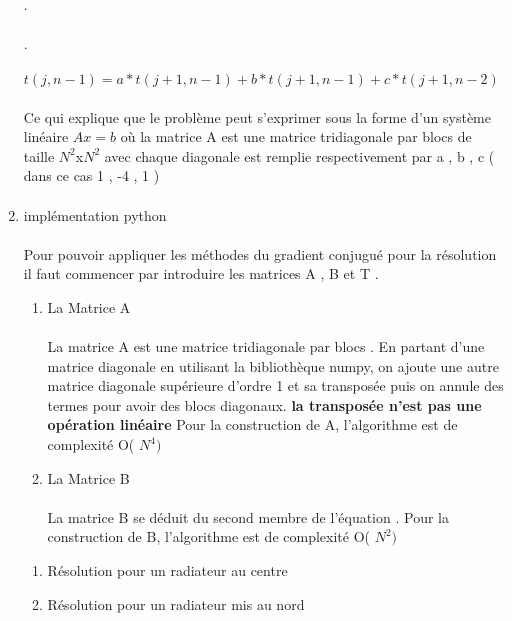 \documentclass{article}
\begin{document}
\begin{enumerate}
    \paragraph{}
    .
    \paragraph{} 
    .
    \paragraph{}
   	
   $t(j,n-1) = a*t(j+1 , n-1) + b*t(j+1,n-1) + c*t(j+1,n-2)$ 
   
   \paragraph{} 
   Ce qui explique que le problème peut s'exprimer sous la forme d'un 
   système linéaire $Ax=b$ où la matrice A est une matrice tridiagonale par blocs 
   de taille $N^2$x$N^2$ avec chaque diagonale est remplie respectivement par a , b , c ( dans ce cas 1 , -4 , 1 )  
   \paragraph{}
   \item{implémentation python} 
 	\paragraph{} 
 	Pour pouvoir appliquer les méthodes du gradient conjugué pour la résolution il 
   faut commencer par introduire les matrices A , B et T . 
 	\begin{enumerate}
 		\item { La Matrice A } 
 		\paragraph{}
 		La matrice A est une matrice tridiagonale par blocs . 
     En partant d'une matrice diagonale en utilisant la bibliothèque numpy, 
     on ajoute une autre matrice diagonale supérieure d'ordre 1 et sa transposée 
     puis on annule des termes pour avoir des blocs diagonaux.
 		\textbf{ la transposée n'est pas une opération linéaire } 
 		Pour la construction de A, l'algorithme est de complexité O( $N^4)$ 
 		\item{La Matrice B} 
 		\paragraph{}
 		La matrice B se déduit du second membre de l'équation . 
 		Pour la construction de B, l'algorithme est de complexité O( $N^2)$   
 	\end{enumerate}
   \begin{enumerate} 
   	\item { Résolution pour un radiateur au centre }  
   	\item{Résolution pour un radiateur mis au nord } 
   \end{enumerate}
   

\end{enumerate}
\end{document}
